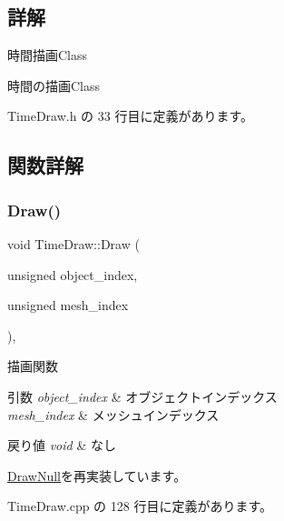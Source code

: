 \subsection{詳解}
時間描画\+Class 

時間の描画\+Class 

 Time\+Draw.\+h の 33 行目に定義があります。



\subsection{関数詳解}
\mbox{\label{class_time_draw_a1d5bd7b20e71eb37f3f0b225079cc9b3}} 
\subsubsection{\texorpdfstring{Draw()}{Draw()}}
{\footnotesize\ttfamily void Time\+Draw\+::\+Draw (\begin{DoxyParamCaption}\item[{unsigned}]{object\+\_\+index,  }\item[{unsigned}]{mesh\+\_\+index }\end{DoxyParamCaption})\hspace{0.3cm}{\ttfamily [override]}, {\ttfamily [virtual]}}



描画関数 


\begin{DoxyParams}{引数}
{\em object\+\_\+index} & オブジェクトインデックス \\
\hline
{\em mesh\+\_\+index} & メッシュインデックス \\
\hline
\end{DoxyParams}

\begin{DoxyRetVals}{戻り値}
{\em void} & なし \\
\hline
\end{DoxyRetVals}


\mbox{\hyperlink{class_draw_null_a72ac0b7dc40b1469582419dcc5b0e114}{Draw\+Null}}を再実装しています。



 Time\+Draw.\+cpp の 128 行目に定義があります。

\mbox{\label{class_time_draw_aea19327b7f9a50a9e634fbb56d430222}} 

